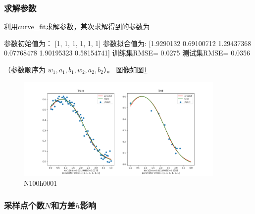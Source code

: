  \subsubsection{求解参数}
 利用curve\_fit求解参数，某次求解得到的参数为
 \begin{python}
参数初始值为： [1, 1, 1, 1, 1, 1]
参数拟合值为: [1.9290132  0.69100712 1.29437368 0.07768478 1.90195323 0.58154741]
训练集RMSE= 0.0275
测试集RMSE= 0.0356
 \end{python}
 （参数顺序为 $w_1, a_1,b_1,w_2,a_2,b_2$）。
 图像如图\ref{fig:N100h0001}
 \begin{figure}[H]
    \begin{center}
        \includegraphics[width=0.9\textwidth]{img/1-N100h0001.png}
    \end{center}
   \caption[]{N100h0001}
    \label{fig:N100h0001}
\end{figure} 

 \subsubsection{采样点个数$N$和方差$h$影响}

